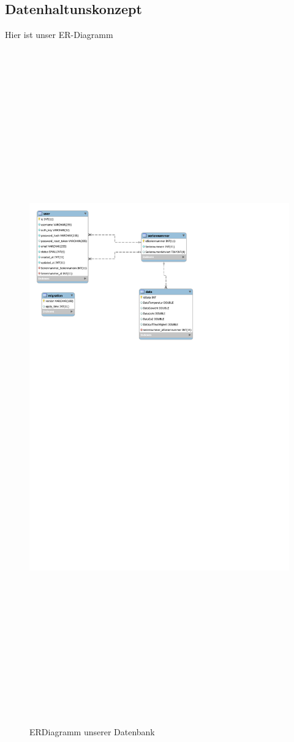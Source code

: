\subsection{Datenhaltunskonzept}
Hier ist unser ER-Diagramm
	\begin{figure}[H]         
	\includegraphics[height=1000pt]{figures/ERDiagramm}
	\caption{ERDiagramm unserer Datenbank}
	\end{figure}
	                                                                                                
